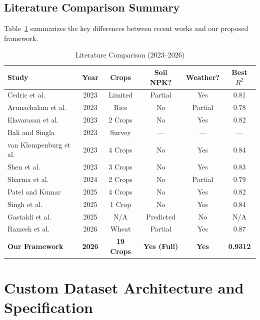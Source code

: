 \documentclass[11pt,a4paper]{article}
\begin{document}
\subsection{Literature Comparison Summary}
Table~\ref{tab:literature_comparison} summarizes the key differences between recent works and our proposed framework.

\begin{table}[H]
\caption{Literature Comparison (2023--2026)}
\label{tab:literature_comparison}
\centering
\small
{}
\begin{tabular}{lccccc}
\toprule
\textbf{Study} & \textbf{Year} & \textbf{Crops} & \textbf{Soil NPK?} & \textbf{Weather?} & \textbf{Best $R^2$} \\
\midrule
Cedric et al. \cite{cedric2023crop} & 2023 & Limited & Partial & Yes & 0.81 \\
Arunachalam et al. \cite{arunachalam2023remote} & 2023 & Rice & No & Partial & 0.78 \\
Elavarasan et al. \cite{elavarasan2023deep} & 2023 & 2 Crops & No & Yes & 0.82 \\
Bali and Singla \cite{bali2023aidriven} & 2023 & Survey & --- & --- & --- \\
van Klompenburg et al. \cite{vanklompenburg2023climate} & 2023 & 4 Crops & No & Yes & 0.84 \\
Shen et al. \cite{shen2023multisource} & 2023 & 3 Crops & No & Yes & 0.83 \\
Sharma et al. \cite{sharma2024remote} & 2024 & 2 Crops & No & Partial & 0.79 \\
Patel and Kumar \cite{patel2025state} & 2025 & 4 Crops & No & Yes & 0.82 \\
Singh et al. \cite{singh2025deep} & 2025 & 1 Crop & No & Yes & 0.84 \\
Gastaldi et al. \cite{gastaldi2025agrolens} & 2025 & N/A & Predicted & No & N/A \\
Ramesh et al. \cite{ramesh2026single} & 2026 & Wheat & Partial & Yes & 0.87 \\
\textbf{Our Framework} & \textbf{2026} & \textbf{19 Crops} & \textbf{Yes (Full)} & \textbf{Yes} & \textbf{0.9312} \\
\bottomrule
\end{tabular}
\end{table}

\section{Custom Dataset Architecture and Specification}
\label{sec:dataset}
\end{document}
